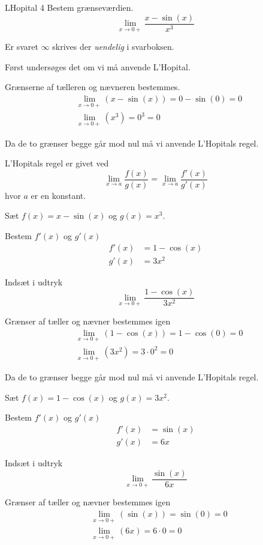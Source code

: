 \documentclass{article}
\begin{document}
\begin{exercise}{LHopital 4}
Bestem grænseværdien.
\[
\lim_{x \to 0+} \frac{x - \sin(x)}{x^3}
\] 

Er svaret $\infty$ skrives der \emph{uendelig} i svarboksen.


\hint
Først undersøges det om vi må anvende L'Hopital.

\hint
Grænserne af tælleren og nævneren bestemmes.
\begin{align*}
	&\lim_{x \to 0+} (x - \sin(x)) = 0 - \sin(0) =  0 \\
	&\lim_{x \to 0+} (x^3) = 0^3 = 0
\end{align*}

\hint
Da de to grænser begge går mod nul må vi  anvende L'Hopitals regel. 

\hint
L'Hopitals regel er givet ved
\[
\lim_{x \to a} \frac{f(x)}{g(x)} = \lim_{x \to a} \frac{f'(x)}{g'(x)} 
\]
hvor $a$ er en konstant.

\hint
Sæt $f(x) = x - \sin(x)$ og $g(x) = x^3$. 

\hint
Bestem $f'(x)$ og $g'(x)$
\begin{align*}
	f'(x) &= 1 - \cos(x) \\
	g'(x) &= 3x^2
\end{align*}

\hint
Indsæt i udtryk
\[
\lim_{x \to 0+} \frac{1 - \cos(x)}{3x^2} 
\]

\hint
Grænser af tæller og nævner bestemmes igen
\begin{align*}
	&\lim_{x \to 0+} (1 - \cos(x)) = 1 - \cos(0) =  0 \\
	&\lim_{x \to 0+} (3x^2) = 3 \cdot 0^2 = 0
\end{align*}

\hint
Da de to grænser begge går mod nul må vi  anvende L'Hopitals regel. 

\hint
Sæt $f(x) = 1 - \cos(x)$ og $g(x) = 3x^2$. 

\hint
Bestem $f'(x)$ og $g'(x)$
\begin{align*}
	f'(x) &=  \sin(x) \\
	g'(x) &= 6x
\end{align*}

\hint
Indsæt i udtryk
\[
\lim_{x \to 0+} \frac{\sin(x)}{6x} 
\]

\hint
Grænser af tæller og nævner bestemmes igen
\begin{align*}
	&\lim_{x \to 0+} (\sin(x)) = \sin(0) =  0 \\
	&\lim_{x \to 0+} (6x) = 6 \cdot 0 = 0
\end{align*}


\end{exercise}
\end{document}
